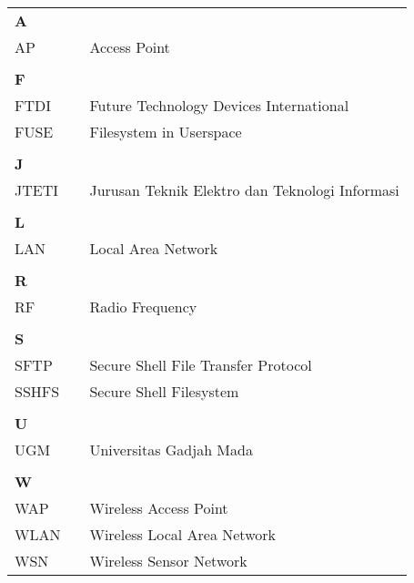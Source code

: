 \documentclass{jtetiskripsi}
\begin{document}
\singkatan
\noindent
\begin{tabular}{lp{3pt}l}

\textbf{A}\\
AP & & Access Point\\
\\

\textbf{F}\\
FTDI & & Future Technology Devices International\\
FUSE & & Filesystem in Userspace\\
\\

\textbf{J}\\
JTETI & & Jurusan Teknik Elektro dan Teknologi Informasi\\
\\

\textbf{L}\\
LAN & & Local Area Network\\
\\

\textbf{R}\\
RF & & Radio Frequency\\
\\

\textbf{S}\\
SFTP & & Secure Shell File Transfer Protocol\\
SSHFS & & Secure Shell Filesystem\\
\\

\textbf{U}\\
UGM & & Universitas Gadjah Mada\\
\\

\textbf{W}\\
WAP & & Wireless Access Point\\
WLAN & & Wireless Local Area Network\\
WSN & & Wireless Sensor Network\\

\end{tabular}
\end{document}
